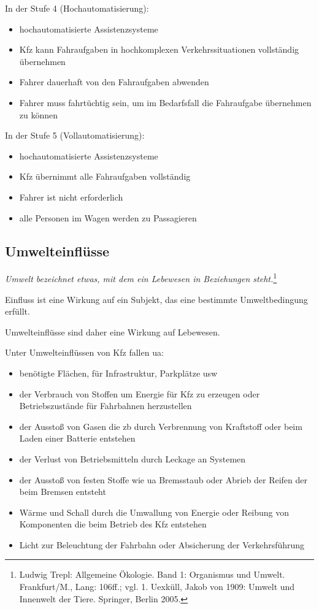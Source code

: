 In der Stufe 4 (Hochautomatisierung):
\begin{itemize}
	\item hochautomatisierte Assistenzsysteme
	\item \ac{Kfz} kann Fahraufgaben in hochkomplexen Verkehrssituationen vollständig übernehmen
	\item Fahrer dauerhaft von den Fahraufgaben abwenden
	\item Fahrer muss fahrtüchtig sein, um im Bedarfsfall die Fahraufgabe übernehmen zu können
\end{itemize}

\vspace{0.5cm}

In der Stufe 5 (Vollautomatisierung):
\begin{itemize}
	\item hochautomatisierte Assistenzsysteme
	\item \ac{Kfz} übernimmt alle Fahraufgaben vollständig
	\item Fahrer ist nicht erforderlich
	\item alle Personen im Wagen werden zu Passagieren
\end{itemize}

\subsection{Umwelteinflüsse}

\textit{Umwelt bezeichnet etwas, mit dem ein Lebewesen in Beziehungen steht.}\footnote{Ludwig Trepl: Allgemeine Ökologie. Band 1: Organismus und Umwelt. Frankfurt/M., Lang: 106ff.; vgl. 1. Uexküll, Jakob von 1909: Umwelt und Innenwelt der Tiere. Springer, Berlin 2005.}

Einfluss ist eine Wirkung auf ein Subjekt, das eine bestimmte Umweltbedingung erfüllt.

Umwelteinflüsse sind daher eine Wirkung auf Lebewesen.

\vspace{.5cm}
Unter Umwelteinflüssen von \ac{Kfz} fallen \ac{ua}:
\begin{itemize}
	\item benötigte Flächen, für Infrastruktur, Parkplätze \ac{usw}
	\item der Verbrauch von Stoffen um Energie für \ac{Kfz} zu erzeugen oder Betriebszustände für Fahrbahnen herzustellen
	\item der Ausstoß von Gasen die \ac{zb} durch Verbrennung von Kraftstoff oder beim Laden einer Batterie entstehen
	\item der Verlust von Betriebsmitteln durch Leckage an Systemen
	\item der Ausstoß von festen Stoffe wie \ac{ua} Bremsstaub oder Abrieb der Reifen der beim Bremsen entsteht
	\item Wärme und Schall durch die Umwallung von Energie oder Reibung von Komponenten die beim Betrieb des \ac{Kfz} entstehen
	\item Licht zur Beleuchtung der Fahrbahn oder Absicherung der Verkehrsführung
\end{itemize}


